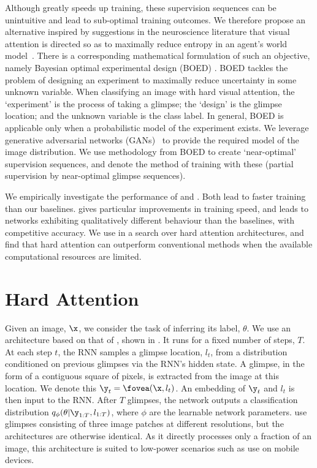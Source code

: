 Although \PSRAM{} greatly speeds up training, these supervision sequences can be
unintuitive and lead to sub-optimal training outcomes. We therefore propose an
alternative inspired by suggestions in the neuroscience literature that visual
attention is directed so as to maximally reduce entropy in an agent's world
model~\cite{bruce2009saliency, itti2009bayesian, schwartenbeck2013exploration,
  feldman2010attention}. There is a corresponding mathematical formulation of
such an objective, namely Bayesian optimal experimental design (BOED)
\cite{chaloner1995bayesian}. BOED tackles the problem of designing an
experiment to maximally reduce uncertainty in some unknown variable. When
classifying an image with hard visual attention, the `experiment' is the process
of taking a glimpse; the `design' is the glimpse location; and the unknown
variable is the class label. In general, BOED is applicable only when a
probabilistic model of the experiment exists. We leverage generative adversarial
networks (GANs)~\cite{goodfellow2014generative} to provide the required model
of the image distribution. We use methodology from BOED to create `near-optimal'
supervision sequences, and denote the method of training with these \PSNOGS{}
(partial supervision by near-optimal glimpse sequences).

We empirically investigate the performance of \PSRAM{} and \PSNOGS{}. Both lead
to faster training than our baselines. \PSNOGS{} gives particular improvements
in training speed, and leads to networks exhibiting qualitatively different
behaviour than the baselines, with competitive accuracy. We use \PSNOGS{} in a
search over hard attention architectures, and find that hard attention can
outperform conventional methods when the available computational resources are
limited.

\section{Hard Attention} \label{sec:nogs-hard-attention}
Given an image, $\x$, we consider the task of inferring its label, $\theta$. We
use an architecture based on that of \cite{mnih2014recurrent}, shown in
. It runs for a fixed number of steps,
$T$. At each step $t$,
%
the RNN samples a glimpse location, $l_t$, from a distribution conditioned on
previous glimpses via the RNN's hidden state. A glimpse, in the form of a
contiguous square of pixels, is extracted from the image at this location. We
denote this $\y_t = \fovea(\x, l_t)$. An embedding of $\y_t$ and $l_t$ is then
input to the RNN.
%
After $T$ glimpses, the network outputs a classification distribution
$q_\phi(\theta|\y_{1:T},l_{1:T})$, where $\phi$ are the learnable network
parameters. \cite{mnih2014recurrent} use glimpses consisting of three image
patches at different resolutions, but the architectures are otherwise identical.
As it directly processes only a fraction of an image, this architecture is
suited to low-power scenarios such as use on mobile devices.

